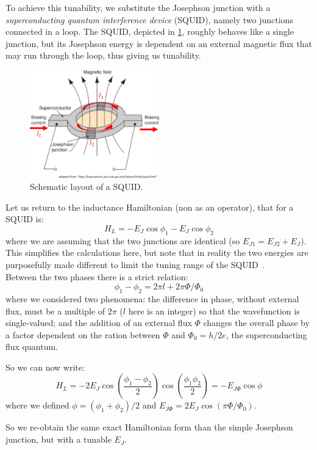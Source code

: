 To achieve this tunability, we substitute the Josephson junction with a \textit{superconducting quantum interference device} (SQUID), namely two junctions connected in a loop.
The SQUID, depicted in \cref{fig:squid}, roughly behaves like a single junction, but its Josephson energy is dependent on an external magnetic flux that may run through the loop, thus giving us tunability.

\begin{figure}[ht]
    \centering
    \includegraphics[width=0.5\textwidth]{Theory/figures/squid.png}
    \caption{Schematic layout of a SQUID.}
    \label{fig:squid}
\end{figure}

Let us return to the inductance Hamiltonian (non as an operator), that for a SQUID is:
\begin{equation}
    H_L=-E_J \cos{\phi_1}-E_J \cos{\phi_2}
\end{equation}
where we are assuming that the two junctions are identical (so $E_{J1}=E_{J2}+E_J$).
This simplifies the calculations here, but note that in reality the two energies are purposefully made different to limit the tuning range of the SQUID~\cite{Koch2007}.\\
Between the two phases there is a strict relation:
\begin{equation}
    \phi_1 - \phi_2 = 2\pi l + 2\pi \Phi/\Phi_0
\end{equation}
where we considered two phenomena: the difference in phase, without external flux, must be a multiple of $2\pi$ ($l$ here is an integer) so that the wavefunction is single-valued; and the addition of an external flux $\Phi$ changes the overall phase by a factor dependent on the ration between $\Phi$ and $\Phi_0=h/2e$, the superconducting flux quantum.

So we can now write:
\begin{equation}\label{eq:hl_flux_tunable}
    H_L = -2E_J \cos \left( \frac{\phi_1 - \phi_2}{2} \right) \cos \left( \frac{\phi_1  \phi_2}{2} \right) = -E_{J\Phi} \cos \phi
\end{equation}
where we defined $\phi=(\phi_1 + \phi_2)/2$ and $E_{J\Phi} = 2E_J\cos (\pi \Phi / \Phi_0)$.

So we re-obtain the same exact Hamiltonian form than the simple Josephson junction, but with a tunable $E_J$.